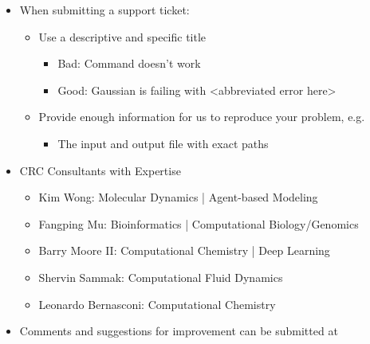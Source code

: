 \documentclass[landscape,a0b,final]{a0poster}
\newcommand{\myurl}[1]{\href{#1}{\color{blue}{#1}}}
\newcommand{\mysection}[1]{
    \begin{center}
        \pbox{0.8\columnwidth}{}{linewidth=3mm,framearc=0.3,linecolor=black,fillstyle=gradient,gradangle=0,gradbegin=white,gradend=white,gradmidpoint=1.0,framesep=0.5em}{
            \begin{center}
                \Large\color{black}{\bf{#1}}
            \end{center}
        }
    \end{center}
    \vspace{0.25cm}
}
\newenvironment{poster}{
  \begin{center}
  \begin{minipage}[c]{0.981\textwidth}
}{
  \end{minipage} 
  \end{center}
}
\newcommand{\pbox}[4]{
\psshadowbox[#3]{
\begin{minipage}[t][#2][t]{#1}
#4
\end{minipage}
}}
\begin{document}
\begin{poster}
\begin{multicols}{3}
    \vspace{0.1cm}
    \mysection{Getting Help}
    \Large    
    \begin{center}
        \begin{itemize}
            \item When submitting a support ticket:
                \begin{itemize}
                    \item Use a descriptive and specific title
                        \begin{itemize}
                            \item Bad: Command doesn't work
                            \item Good: Gaussian is failing with <abbreviated error here>
                        \end{itemize}
                    \item Provide enough information for us to reproduce your problem, e.g.
                        \begin{itemize}
                            \item The input and output file with exact paths
                        \end{itemize}
                \end{itemize}
            \item CRC Consultants with Expertise
                \begin{itemize}
                    \item Kim Wong: Molecular Dynamics | Agent-based Modeling
                    \item Fangping Mu: Bioinformatics | Computational Biology/Genomics
                    \item Barry Moore II: Computational Chemistry | Deep Learning
                    \item Shervin Sammak: Computational Fluid Dynamics
                    \item Leonardo Bernasconi: Computational Chemistry
                \end{itemize}
            \item Comments and suggestions for improvement can be submitted at
                \myurl{https://crc.pitt.edu/contact}
        \end{itemize}
    \end{center}


\end{multicols}
\end{poster}
\end{document}
